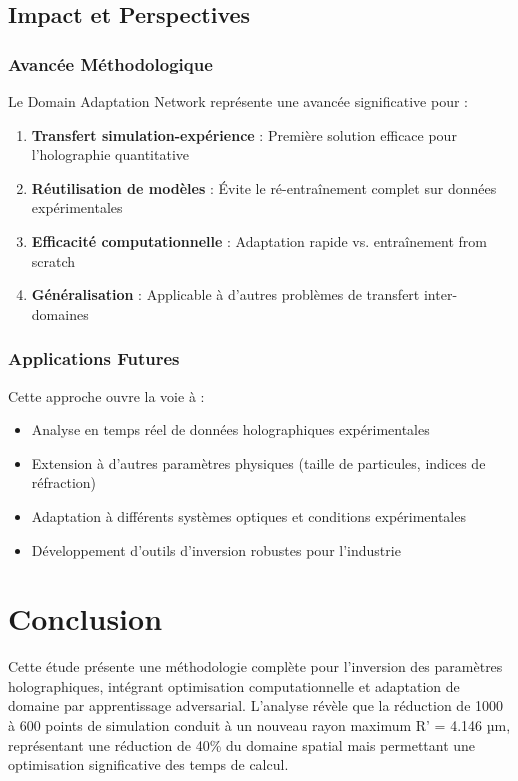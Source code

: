 \documentclass[twocolumn,10pt]{article}
\begin{document}
\subsection{Impact et Perspectives}

\subsubsection{Avancée Méthodologique}

Le Domain Adaptation Network représente une avancée significative pour :

\begin{enumerate}
\item \textbf{Transfert simulation-expérience} : Première solution efficace pour l'holographie quantitative
\item \textbf{Réutilisation de modèles} : Évite le ré-entraînement complet sur données expérimentales
\item \textbf{Efficacité computationnelle} : Adaptation rapide vs. entraînement from scratch
\item \textbf{Généralisation} : Applicable à d'autres problèmes de transfert inter-domaines
\end{enumerate}

\subsubsection{Applications Futures}

Cette approche ouvre la voie à :
\begin{itemize}
\item Analyse en temps réel de données holographiques expérimentales
\item Extension à d'autres paramètres physiques (taille de particules, indices de réfraction)
\item Adaptation à différents systèmes optiques et conditions expérimentales
\item Développement d'outils d'inversion robustes pour l'industrie
\end{itemize}

\section{Conclusion}

Cette étude présente une méthodologie complète pour l'inversion des paramètres holographiques, intégrant optimisation computationnelle et adaptation de domaine par apprentissage adversarial. L'analyse révèle que la réduction de 1000 à 600 points de simulation conduit à un nouveau rayon maximum R' = 4.146 µm, représentant une réduction de 40\% du domaine spatial mais permettant une optimisation significative des temps de calcul.
\end{document}
